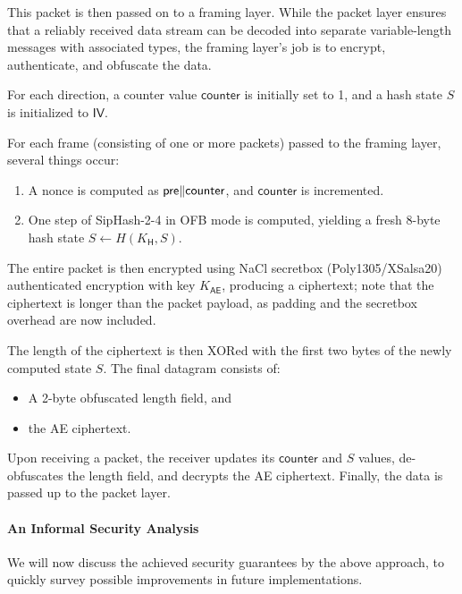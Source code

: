 This packet is then passed on to a framing layer. While the packet layer ensures that a reliably received data stream can be decoded into separate variable-length messages with associated types, the framing layer's job is to encrypt, authenticate, and obfuscate the data.

For each direction, a counter value $\mathsf{counter}$ is initially set to 1, and a hash state $S$ is initialized to $\mathsf{IV}$.

For each frame (consisting of one or more packets) passed to the framing layer, several things occur:
\begin{enumerate}
    \item A nonce is computed as $ \mathsf{pre} \| \mathsf{counter}$, and $\mathsf{counter}$ is incremented.
    \item One step of SipHash-2-4 in OFB mode is computed, yielding a fresh 8-byte hash state $S \gets H(K_\mathsf{H}, S)$.
\end{enumerate}

The entire packet is then encrypted using NaCl secretbox (Poly1305/XSalsa20) authenticated encryption with key $K_\mathsf{AE}$, producing a ciphertext; note that the ciphertext is longer than the packet payload, as padding and the secretbox overhead are now included.

The length of the ciphertext is then XORed with the first two bytes of the newly computed state $S$. The final datagram consists of:
\begin{itemize}
    \item A 2-byte obfuscated length field, and
    \item the AE ciphertext.
\end{itemize}

Upon receiving a packet, the receiver updates its $\mathsf{counter}$ and $S$ values, de-obfuscates the length field, and decrypts the AE ciphertext. Finally, the data is passed up to the packet layer.

\paragraph{An Informal Security Analysis}

We will now discuss the achieved security guarantees by the above approach, to quickly survey possible improvements in future implementations.

